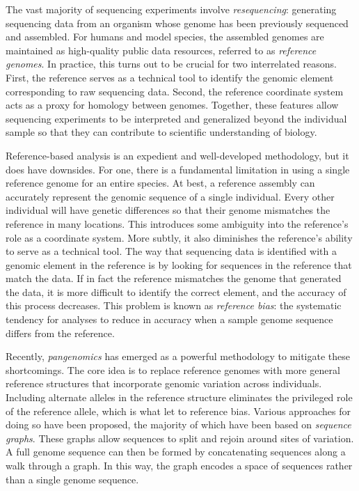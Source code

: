 \documentclass[11pt]{ucthesis}
\begin{document}
The vast majority of sequencing experiments involve \emph{resequencing}: generating sequencing data from an organism whose genome has been previously sequenced and assembled. For humans and model species, the assembled genomes are maintained as high-quality public data resources, referred to as \emph{reference genomes}. In practice, this turns out to be crucial for two interrelated reasons. First, the reference serves as a technical tool to identify the genomic element corresponding to raw sequencing data. Second, the reference coordinate system acts as a proxy for homology between genomes. Together, these features allow sequencing experiments to be interpreted and generalized beyond the individual sample so that they can contribute to scientific understanding of biology.

Reference-based analysis is an expedient and well-developed methodology, but it does have downsides. For one, there is a fundamental limitation in using a single reference genome for an entire species. At best, a reference assembly can accurately represent the genomic sequence of a single individual. Every other individual will have genetic differences so that their genome mismatches the reference in many locations. This introduces some ambiguity into the reference's role as a coordinate system. More subtly, it also diminishes the reference's ability to serve as a technical tool. The way that sequencing data is identified with a genomic element in the reference is by looking for sequences in the reference that match the data. If in fact the reference mismatches the genome that generated the data, it is more difficult to identify the correct element, and the accuracy of this process decreases. This problem is known as \emph{reference bias}: the systematic tendency for analyses to reduce in accuracy when a sample genome sequence differs from the reference. 

Recently, \emph{pangenomics} has emerged as a powerful methodology to mitigate these shortcomings. The core idea is to replace reference genomes with more general reference structures that incorporate genomic variation across individuals. Including alternate alleles in the reference structure eliminates the privileged role of the reference allele, which is what let to reference bias. Various approaches for doing so have been proposed, the majority of which have been based on \emph{sequence graphs}. These graphs allow sequences to split and rejoin around sites of variation. A full genome sequence can then be formed by concatenating sequences along a walk through a graph. In this way, the graph encodes a space of sequences rather than a single genome sequence.
\end{document}
